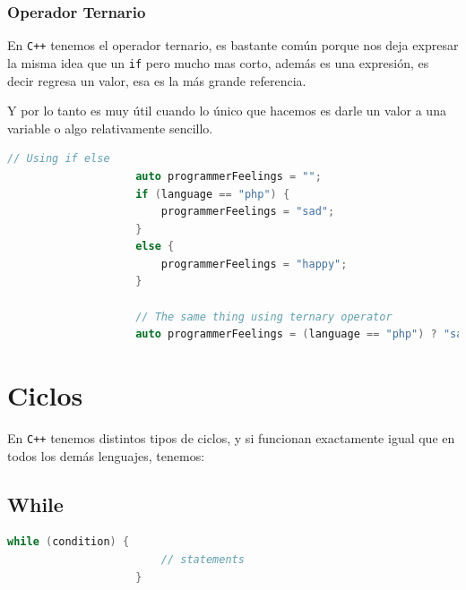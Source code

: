 \documentclass[12pt, fleqn]{report}                             %
\theoremstyle{break}                                            %
\newcommand{\textCode}[1]  { \texttt{#1} }                      %
\newcommand{\Cpp}{\ignorespaces\textCode{C++}}                  %
\begin{document}
                \clearpage
                \subsubsection{Operador Ternario}

                En \Cpp tenemos el operador ternario, es bastante común porque nos deja expresar la misma
                idea que un \textCode{if} pero mucho mas corto, además es una expresión, es decir
                regresa un valor, esa es la más grande referencia.

                Y por lo tanto es muy útil cuando lo único que hacemos es darle un valor a una variable
                o algo relativamente sencillo.

                \begin{lstlisting}[language=C++, gobble=20]
                    // Using if else
                    auto programmerFeelings = "";
                    if (language == "php") {
                        programmerFeelings = "sad";
                    }
                    else {
                        programmerFeelings = "happy";
                    }

                    // The same thing using ternary operator
                    auto programmerFeelings = (language == "php") ? "sad" : "happy";
                \end{lstlisting}
                
        \clearpage
        \section{Ciclos}
            
            En \Cpp tenemos distintos tipos de ciclos, y si funcionan exactamente igual que
            en todos los demás lenguajes, tenemos:

            
            \subsection{While}
                \begin{lstlisting}[language=C++, gobble=20]
                    while (condition) {
                        // statements
                    }
                \end{lstlisting}
\end{document}
